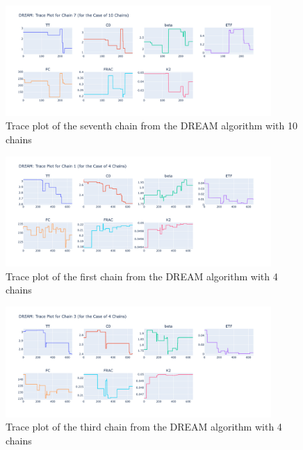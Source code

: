 \begin{figure}[H]
    \centering
    \includegraphics[width=0.9\textwidth]{figures/dream/tp_rand_10_7.png}
    \captionsetup{width=.8\textwidth}
    \caption{Trace plot of the seventh chain from the DREAM algorithm with 10 chains}
    \label{fig:enter-label}
\end{figure}

\begin{figure}[H]
    \centering
    \includegraphics[width=0.9\textwidth]{figures/dream/tp_rand_4_1.png}
    \captionsetup{width=.8\textwidth}
    \caption{Trace plot of the first chain from the DREAM algorithm with 4 chains}
    \label{fig:enter-label}
\end{figure}

\begin{figure}[H]
    \centering
    \includegraphics[width=0.9\textwidth]{figures/dream/tp_rand_4_3.png}
    \captionsetup{width=.8\textwidth}
    \caption{Trace plot of the third chain from the DREAM algorithm with 4 chains}
    \label{fig:enter-label}
\end{figure}

